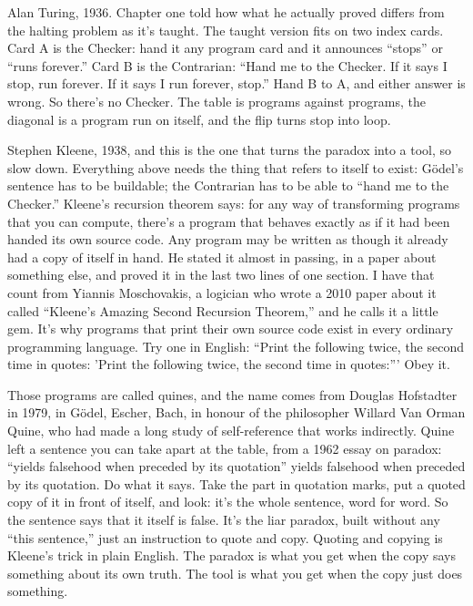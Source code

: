 \documentclass[11pt,twoside]{article}
\theoremstyle{thielethm}
\theoremstyle{thieledef}
\theoremstyle{thieledef}
\theoremstyle{thieledef}
\theoremstyle{thielethm}
\theoremstyle{thieleobs}
\theoremstyle{thielethm}
\begin{document}
Alan Turing, 1936. Chapter one told how what he actually proved differs from the halting problem as it's taught. The taught version fits on two index cards. Card A is the Checker: hand it any program card and it announces ``stops'' or ``runs forever.'' Card B is the Contrarian: ``Hand me to the Checker. If it says I stop, run forever. If it says I run forever, stop.'' Hand B to A, and either answer is wrong. So there's no Checker. The table is programs against programs, the diagonal is a program run on itself, and the flip turns stop into loop.

Stephen Kleene, 1938, and this is the one that turns the paradox into a tool, so slow down. Everything above needs the thing that refers to itself to exist: Gödel's sentence has to be buildable; the Contrarian has to be able to ``hand me to the Checker.'' Kleene's recursion theorem says: for any way of transforming programs that you can compute, there's a program that behaves exactly as if it had been handed its own source code. Any program may be written as though it already had a copy of itself in hand. He stated it almost in passing, in a paper about something else, and proved it in the last two lines of one section. I have that count from Yiannis Moschovakis, a logician who wrote a 2010 paper about it called ``Kleene's Amazing Second Recursion Theorem,'' and he calls it a little gem. It's why programs that print their own source code exist in every ordinary programming language. Try one in English: ``Print the following twice, the second time in quotes: 'Print the following twice, the second time in quotes:''' Obey it.

Those programs are called quines, and the name comes from Douglas Hofstadter in 1979, in Gödel, Escher, Bach, in honour of the philosopher Willard Van Orman Quine, who had made a long study of self-reference that works indirectly. Quine left a sentence you can take apart at the table, from a 1962 essay on paradox: ``yields falsehood when preceded by its quotation'' yields falsehood when preceded by its quotation. Do what it says. Take the part in quotation marks, put a quoted copy of it in front of itself, and look: it's the whole sentence, word for word. So the sentence says that it itself is false. It's the liar paradox, built without any ``this sentence,'' just an instruction to quote and copy. Quoting and copying is Kleene's trick in plain English. The paradox is what you get when the copy says something about its own truth. The tool is what you get when the copy just does something.
\end{document}
